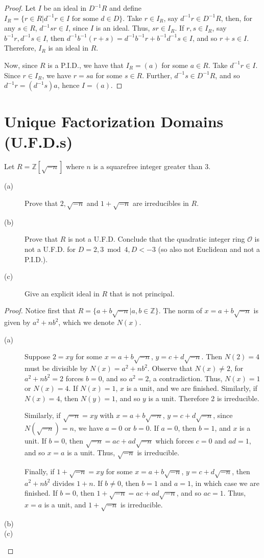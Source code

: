 \documentclass[12pt,leqno]{book}
\numberwithin{equation}{section}
\newcommand{\question}[2] {\vspace{.25in}\noindent\fbox{#1} #2 \vspace{.10in}}
\theoremstyle{definition}
\begin{document}
\begin{proof}
Let $I$ be an ideal in $D^{-1}R$ and define $I_R=\{r\in R|d^{-1}r\in I\text{ for some }d\in D\}$. Take $r\in I_R$, say $d^{-1}r\in D^{-1}R$, then, for any $s\in R$, $d^{-1}sr\in I$, since $I$ is an ideal. Thus, $sr\in I_R$. If $r,s\in I_R$, say $b^{-1}r,d^{-1}s\in I$, then $d^{-1}b^{-1}(r+s)=d^{-1}b^{-1}r+b^{-1}d^{-1}s\in I$, and so $r+s\in I$. Therefore, $I_R$ is an ideal in $R$.

Now, since $R$ is a P.I.D., we have that $I_R=(a)$ for some $a\in R$. Take $d^{-1}r\in I$. Since $r\in I_R$, we have $r=sa$ for some $s\in R$. Further, $d^{-1}s\in D^{-1}R$, and so $d^{-1}r=(d^{-1}s)a$, hence $I=(a)$.
\end{proof}


\section{Unique Factorization Domains (U.F.D.s)}

\question{5}{Let $R=\mathbb{Z}[\sqrt{-n}]$ where $n$ is a squarefree integer greater than 3.}
\begin{description}
 \item [(a)] Prove that $2,\sqrt{-n}$ and $1+\sqrt{-n}$ are irreducibles in $R$.
 \item [(b)] Prove that $R$ is not a U.F.D. Conclude that the quadratic integer ring $\mathcal{O}$ is not a U.F.D. for $D=2,3\bmod{4},D<-3$ (so also not Euclidean and not a P.I.D.).
 \item [(c)] Give an explicit ideal in $R$ that is not principal.
\end{description}

\begin{proof}Notice first that $R=\{a+b\sqrt{-n}|a,b\in\mathbb{Z}\}$. The norm of $x=a+b\sqrt{-n}$ is given by $a^2+nb^2$, which we denote $N(x)$.
 \begin{description}
  \item [(a)] Suppose $2=xy$ for some $x=a+b\sqrt{-n}$, $y=c+d\sqrt{-n}$. Then $N(2)=4$ must be divisible by $N(x)=a^2+nb^2$. Observe that $N(x)\not=2$, for $a^2+nb^2=2$ forces $b=0$, and so $a^2=2$, a contradiction. Thus, $N(x)=1$ or $N(x)=4$. If $N(x)=1$, $x$ is a unit, and we are finished. Similarly, if $N(x)=4$, then $N(y)=1$, and so $y$ is a unit. Therefore 2 is irreducible.

Similarly, if $\sqrt{-n}=xy$ with $x=a+b\sqrt{-n}$, $y=c+d\sqrt{-n}$, since $N(\sqrt{-n})=n$, we have $a=0$ or $b=0$. If $a=0$, then $b=1$, and $x$ is a unit. If $b=0$, then $\sqrt{-n}=ac+ad\sqrt{-n}$ which forces $c=0$ and $ad=1$, and so $x=a$ is a unit. Thus, $\sqrt{-n}$ is irreducible.

Finally, if $1+\sqrt{-n}=xy$ for some $x=a+b\sqrt{-n}$, $y=c+d\sqrt{-n}$, then $a^2+nb^2$ divides $1+n$. If $b\not=0$, then $b=1$ and $a=1$, in which case we are finished. If $b=0$, then $1+\sqrt{-n}=ac+ad\sqrt{-n}$, and so $ac=1$. Thus, $x=a$ is a unit, and $1+\sqrt{-n}$ is irreducible.
 \item [(b)] 
 \item [(c)]
 \end{description}
\end{proof}
\end{document}
